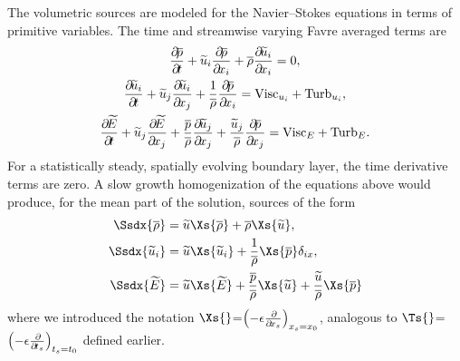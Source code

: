 {The volumetric sources are modeled for the Navier--Stokes
equations in terms of primitive variables. The time and streamwise varying
Favre averaged terms are
%
\begin{gather}
   \pp{\mean{\rho} }{t}+ \fav{u}_i \pp{\mean{\rho}}{x_i} + \mean{\rho} \pp{\fav{u}_i}{x_i} = 0,
\\ \pp{\fav{u}_i   }{t}+ \fav{u}_j \pp{\fav{u}_i  }{x_j} + \frac{1}{\mean{\rho}}
   \pp{\mean{p} }{x_i} =  \text{Visc}_{u_i} + \text{Turb}_{u_i},
\\   \pp{\fav{E}     }{t}+ \fav{u}_j \pp{\fav{E    }}{x_j}
                  + \frac{\mean{p} }{\mean{\rho}} \pp{\fav{u}_j}{x_j}
                  + \frac{\fav{u}_j}{\mean{\rho}} \pp{\mean{p} }{x_j}
= \text{Visc}_{E} + \text{Turb}_{E}.
\end{gather}
%
For a statistically steady, spatially evolving boundary layer, the time
derivative terms are zero. A slow growth homogenization of the equations above
would produce, for the mean part of the solution, sources of the form
%
\begin{gather}
\begin{align}
\Ssdx{\mean{\rho}}&=  \fav{u} \Xs{\mean{\rho}} + \mean{\rho} \Xs{\fav{u}},  \\
\Ssdx{\fav{u}_i}  &=  \fav{u} \Xs{\fav{u}_i} + \frac{1}{\mean{\rho}} \Xs{\mean{p}} \delta_{ix}, \\
\Ssdx{\fav{E}}    &=  \fav{u} \Xs{\fav{E}}
                  + \frac{\mean{p}}{\mean{\rho}} \Xs{\fav{u} }
                  + \frac{\fav{u} }{\mean{\rho}} \Xs{\mean{p}}
\end{align}
\end{gather}
%
where we introduced the notation
$\Xs{}$=$\left(-\epsilon \frac{\partial\!{}}{\partial\!{x_s}}\right)_{x_s=x_0}$,
analogous to $\Ts{}$=$\left(-\epsilon \frac{\partial\!{}}{\partial\!{t_s}}\right)_{t_s=t_0}$ defined
earlier.

}
